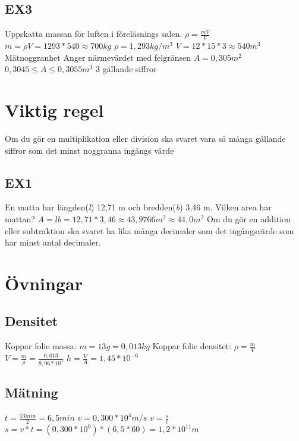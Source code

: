 \documentclass[a4paper,11pt]{article}
\begin{document}
\begin{flushleft}
\subsection{EX3}
Uppskatta massan för luften i föreläsnings salen.\newline
$ \rho = \frac{m V}{V} $\newline
$ m = \rho V = 1293 * 540 \approx 700 kg $\newline
$ \rho = 1,293 kg/m^3 $\newline
$ V = 12 * 15 * 3  \approx 540 m^3 $
Mätnoggranhet\newline
Anger närmevärdet med felgränsen\newline
$ A = 0,305 m^2 $\newline
$ 0,3045 \leqslant  A \leqslant  0,3055 m^3 $ 3 gällande siffror\newline
\newpage
\section{Viktig regel}
Om du gör en multiplikation eller division ska svaret vara så många gällande siffror som det minst noggranna ingångs värde\newline
\newline
\subsection{EX1}
En matta har längden(\textit{l}) 12,71 m och bredden(\textit{b}) 3,46 m.\newline
Vilken area har mattan?\newline
$ A = lb = 12,71 * 3,46 \approx 43,9766 m^2 \approx 44,0 m^2 $\newline
Om du gör en addition eller subtraktion ska svaret ha lika många decimaler som det ingångsvärde som har minst antal decimaler.
\section{Övningar}
\subsection{Densitet}
Koppar folie massa: $m=13g=0,013kg $\newline
Koppar folie densitet: $ \rho=\frac{m}{V} $ $ V=\frac{m}{\rho} = \frac{0,013}{8,96*10^3} $\newline
$ h=\frac{V}{A}=1,45*10^{-6} $
\subsection{Mätning}
$ t=\frac{13min}{2}=6,5min $
$ v= 0,300*10^4 m/s $\newline
$ v=\frac{s}{t} $\newline
$ s=v*t = (0,300*10^9)*(6,5*60)=1,2*10^{11}m $

\end{flushleft}
\end{document}
